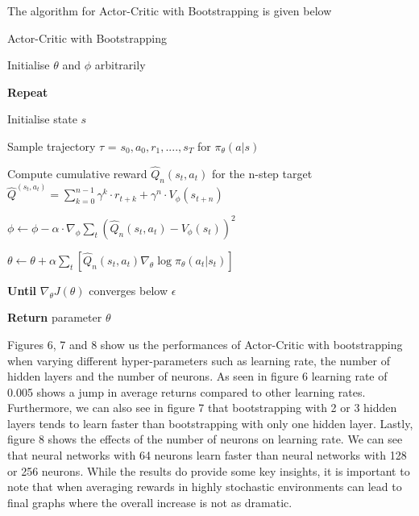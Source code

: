 \documentclass{article}
\begin{document}
The algorithm for Actor-Critic with Bootstrapping is given below \cite{plaat-deeprl}
\begin{algorithm}[h!]
\caption{Actor-Critic with Bootstrapping}
\SetAlgoLined
\DontPrintSemicolon
\small %
Initialise $\theta$ and $\phi$ arbitrarily\;\\
\item \textbf{Repeat} \;\\
{
    \item Initialise state $s$\;
    \item Sample trajectory $\tau$ = ${s_0,a_0,r_1,....,s_T}$ for $\pi_\theta(a|s)$
     \item 
    {
     \item Compute cumulative reward $\hat{Q}_n(s_t,a_t)$ for the n-step target
     \newline \(\hat{Q}^(s_t,a_t) = \sum_{k=0}^{n-1}\gamma^k\cdot r_{t+k} + \gamma^{n} \cdot V_\phi (s_{t+n})\)
    }
}
    \item $\phi \leftarrow \phi - \alpha \cdot \nabla_\phi \sum_t (\hat{Q}_n(s_t, a_t) - V_\phi(s_t))^2$ \;
    \item $\theta \leftarrow \theta + \alpha \sum_t [\hat{Q}_n(s_t, a_t) \nabla_\theta \log \pi_\theta(a_t | s_t)]$\;
\item \textbf{Until} $\nabla_\theta J(\theta)$ converges below $\epsilon$ \;
\item \textbf{Return} parameter $\theta$
\end{algorithm}

\par Figures 6, 7 and 8 show us the performances of Actor-Critic with bootstrapping when varying different hyper-parameters such as learning rate, the number of hidden layers and the number of neurons. As seen in figure 6 learning rate of 0.005 shows a jump in average returns compared to other learning rates. Furthermore, we can also see in figure 7 that bootstrapping with 2 or 3 hidden layers tends to learn faster than bootstrapping with only one hidden layer. Lastly, figure 8 shows the effects of the number of neurons on learning rate. We can see that neural networks with 64 neurons learn faster than neural networks with 128 or 256 neurons. While the results do provide some key insights, it is important to note that when averaging rewards in highly stochastic environments can lead to final graphs where the overall increase is not as dramatic.
\end{document}
